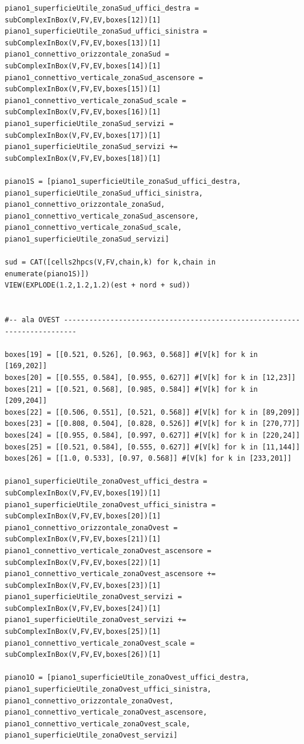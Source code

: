 \documentclass[11pt, oneside]{article}   	%
\begin{document}
\begin{verbatim}
piano1_superficieUtile_zonaSud_uffici_destra = subComplexInBox(V,FV,EV,boxes[12])[1]
piano1_superficieUtile_zonaSud_uffici_sinistra = subComplexInBox(V,FV,EV,boxes[13])[1]
piano1_connettivo_orizzontale_zonaSud = subComplexInBox(V,FV,EV,boxes[14])[1]
piano1_connettivo_verticale_zonaSud_ascensore = subComplexInBox(V,FV,EV,boxes[15])[1]
piano1_connettivo_verticale_zonaSud_scale = subComplexInBox(V,FV,EV,boxes[16])[1]
piano1_superficieUtile_zonaSud_servizi = subComplexInBox(V,FV,EV,boxes[17])[1]
piano1_superficieUtile_zonaSud_servizi += subComplexInBox(V,FV,EV,boxes[18])[1]

piano1S = [piano1_superficieUtile_zonaSud_uffici_destra, piano1_superficieUtile_zonaSud_uffici_sinistra, piano1_connettivo_orizzontale_zonaSud, piano1_connettivo_verticale_zonaSud_ascensore, piano1_connettivo_verticale_zonaSud_scale, piano1_superficieUtile_zonaSud_servizi]
    
sud = CAT([cells2hpcs(V,FV,chain,k) for k,chain in enumerate(piano1S)])
VIEW(EXPLODE(1.2,1.2,1.2)(est + nord + sud))


#-- ala OVEST -------------------------------------------------------------------------

boxes[19] = [[0.521, 0.526], [0.963, 0.568]] #[V[k] for k in [169,202]]
boxes[20] = [[0.555, 0.584], [0.955, 0.627]] #[V[k] for k in [12,23]]
boxes[21] = [[0.521, 0.568], [0.985, 0.584]] #[V[k] for k in [209,204]]
boxes[22] = [[0.506, 0.551], [0.521, 0.568]] #[V[k] for k in [89,209]]
boxes[23] = [[0.808, 0.504], [0.828, 0.526]] #[V[k] for k in [270,77]]
boxes[24] = [[0.955, 0.584], [0.997, 0.627]] #[V[k] for k in [220,24]]
boxes[25] = [[0.521, 0.584], [0.555, 0.627]] #[V[k] for k in [11,144]]
boxes[26] = [[1.0, 0.533], [0.97, 0.568]] #[V[k] for k in [233,201]]

piano1_superficieUtile_zonaOvest_uffici_destra = subComplexInBox(V,FV,EV,boxes[19])[1]
piano1_superficieUtile_zonaOvest_uffici_sinistra = subComplexInBox(V,FV,EV,boxes[20])[1]
piano1_connettivo_orizzontale_zonaOvest = subComplexInBox(V,FV,EV,boxes[21])[1]
piano1_connettivo_verticale_zonaOvest_ascensore = subComplexInBox(V,FV,EV,boxes[22])[1]
piano1_connettivo_verticale_zonaOvest_ascensore += subComplexInBox(V,FV,EV,boxes[23])[1]
piano1_superficieUtile_zonaOvest_servizi = subComplexInBox(V,FV,EV,boxes[24])[1]
piano1_superficieUtile_zonaOvest_servizi += subComplexInBox(V,FV,EV,boxes[25])[1]
piano1_connettivo_verticale_zonaOvest_scale = subComplexInBox(V,FV,EV,boxes[26])[1]

piano1O = [piano1_superficieUtile_zonaOvest_uffici_destra, piano1_superficieUtile_zonaOvest_uffici_sinistra, piano1_connettivo_orizzontale_zonaOvest, piano1_connettivo_verticale_zonaOvest_ascensore, piano1_connettivo_verticale_zonaOvest_scale, piano1_superficieUtile_zonaOvest_servizi]
    

\end{verbatim}
\end{document}
